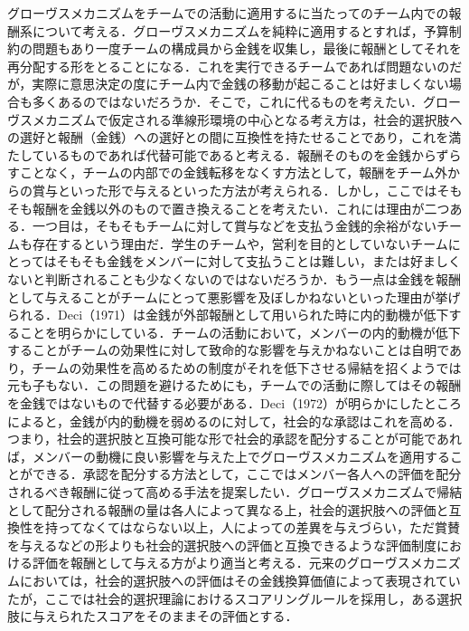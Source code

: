 \documentclass[a4paper, 11pt]{jsarticle}
\begin{document}
グローヴスメカニズムをチームでの活動に適用するに当たってのチーム内での報酬系について考える．グローヴスメカニズムを純粋に適用するとすれば，予算制約の問題もあり一度チームの構成員から金銭を収集し，最後に報酬としてそれを再分配する形をとることになる．これを実行できるチームであれば問題ないのだが，実際に意思決定の度にチーム内で金銭の移動が起こることは好ましくない場合も多くあるのではないだろうか．そこで，これに代るものを考えたい．グローヴスメカニズムで仮定される準線形環境の中心となる考え方は，社会的選択肢への選好と報酬（金銭）への選好との間に互換性を持たせることであり，これを満たしているものであれば代替可能であると考える．報酬そのものを金銭からずらすことなく，チームの内部での金銭転移をなくす方法として，報酬をチーム外からの賞与といった形で与えるといった方法が考えられる．しかし，ここではそもそも報酬を金銭以外のもので置き換えることを考えたい．これには理由が二つある．一つ目は，そもそもチームに対して賞与などを支払う金銭的余裕がないチームも存在するという理由だ．学生のチームや，営利を目的としていないチームにとってはそもそも金銭をメンバーに対して支払うことは難しい，または好ましくないと判断されることも少なくないのではないだろうか．もう一点は金銭を報酬として与えることがチームにとって悪影響を及ぼしかねないといった理由が挙げられる．Deci（1971）\cite{Deci}は金銭が外部報酬として用いられた時に内的動機が低下することを明らかにしている．チームの活動において，メンバーの内的動機が低下することがチームの効果性に対して致命的な影響を与えかねないことは自明であり，チームの効果性を高めるための制度がそれを低下させる帰結を招くようでは元も子もない．この問題を避けるためにも，チームでの活動に際してはその報酬を金銭ではないもので代替する必要がある．Deci（1972）\cite{Deci2}が明らかにしたところによると，金銭が内的動機を弱めるのに対して，社会的な承認はこれを高める．つまり，社会的選択肢と互換可能な形で社会的承認を配分することが可能であれば，メンバーの動機に良い影響を与えた上でグローヴスメカニズムを適用することができる．承認を配分する方法として，ここではメンバー各人への評価を配分されるべき報酬に従って高める手法を提案したい．グローヴスメカニズムで帰結として配分される報酬の量は各人によって異なる上，社会的選択肢への評価と互換性を持ってなくてはならない以上，人によっての差異を与えづらい，ただ賞賛を与えるなどの形よりも社会的選択肢への評価と互換できるような評価制度における評価を報酬として与える方がより適当と考える．元来のグローヴスメカニズムにおいては，社会的選択肢への評価はその金銭換算価値によって表現されていたが，ここでは社会的選択理論におけるスコアリングルールを採用し，ある選択肢に与えられたスコアをそのままその評価とする．
\end{document}
